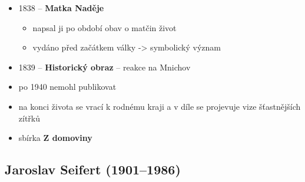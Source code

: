 \begin{itemize}
\item 1838 -- \textbf{Matka Naděje}
	\begin{itemize}
	\item napsal ji po období obav o matčin život
	\item vydáno před začátkem války -> symbolický význam
	\end{itemize}
\item 1839 -- \textbf{Historický obraz} -- reakce na Mnichov
\item po 1940 nemohl publikovat
\item na konci života se vrací k rodnému kraji a v díle se projevuje vize šťastnějších zítřků
\item sbírka \textbf{Z domoviny}
\end{itemize}

\subsection{Jaroslav Seifert (1901--1986)}
